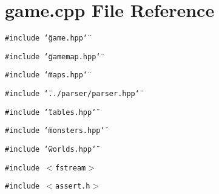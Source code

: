 \section{game.cpp File Reference}
\label{game_8cpp}
{\tt \#include \char`\"{}game.hpp\char`\"{}}\par
{\tt \#include \char`\"{}gamemap.hpp\char`\"{}}\par
{\tt \#include \char`\"{}maps.hpp\char`\"{}}\par
{\tt \#include \char`\"{}../parser/parser.hpp\char`\"{}}\par
{\tt \#include \char`\"{}tables.hpp\char`\"{}}\par
{\tt \#include \char`\"{}monsters.hpp\char`\"{}}\par
{\tt \#include \char`\"{}worlds.hpp\char`\"{}}\par
{\tt \#include $<$fstream$>$}\par
{\tt \#include $<$assert.h$>$}\par
